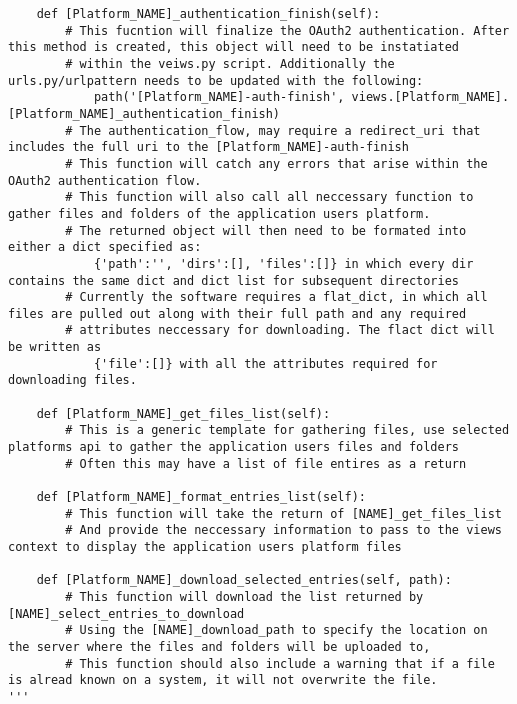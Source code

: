 \documentclass{article}
\begin{document}
\begin{verbatim}
    def [Platform_NAME]_authentication_finish(self):
        # This fucntion will finalize the OAuth2 authentication. After this method is created, this object will need to be instatiated
        # within the veiws.py script. Additionally the urls.py/urlpattern needs to be updated with the following:
            path('[Platform_NAME]-auth-finish', views.[Platform_NAME].[Platform_NAME]_authentication_finish)
        # The authentication_flow, may require a redirect_uri that includes the full uri to the [Platform_NAME]-auth-finish
        # This function will catch any errors that arise within the OAuth2 authentication flow. 
        # This function will also call all neccessary function to gather files and folders of the application users platform.
        # The returned object will then need to be formated into either a dict specified as:
            {'path':'', 'dirs':[], 'files':[]} in which every dir contains the same dict and dict list for subsequent directories
        # Currently the software requires a flat_dict, in which all files are pulled out along with their full path and any required 
        # attributes neccessary for downloading. The flact dict will be written as
            {'file':[]} with all the attributes required for downloading files.

    def [Platform_NAME]_get_files_list(self):
        # This is a generic template for gathering files, use selected platforms api to gather the application users files and folders
        # Often this may have a list of file entires as a return

    def [Platform_NAME]_format_entries_list(self):
        # This function will take the return of [NAME]_get_files_list
        # And provide the neccessary information to pass to the views context to display the application users platform files
    
    def [Platform_NAME]_download_selected_entries(self, path):
        # This function will download the list returned by [NAME]_select_entries_to_download
        # Using the [NAME]_download_path to specify the location on the server where the files and folders will be uploaded to, 
        # This function should also include a warning that if a file is alread known on a system, it will not overwrite the file.
'''
\end{verbatim}
\end{document}
